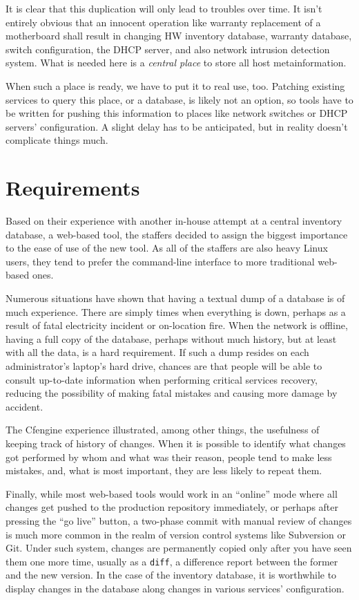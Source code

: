 \documentclass[11pt]{article}
\begin{document}
It is clear that this duplication will only lead to troubles over time.  It
isn't entirely obvious that an innocent operation like warranty replacement of a
motherboard shall result in changing HW inventory database, warranty database,
switch configuration, the DHCP server, and also network intrusion detection
system.  What is needed here is a {\em central place} to store all host
metainformation.

When such a place is ready, we have to put it to real use, too.  Patching
existing services to query this place, or a database, is likely not an option,
so tools have to be written for pushing this information to places like network
switches or DHCP servers' configuration.  A slight delay has to be anticipated,
but in reality doesn't complicate things much.

\section{Requirements}

Based on their experience with another in-house attempt at a central inventory
database, a web-based tool, the staffers decided to assign the biggest
importance to the ease of use of the new tool.  As all of the staffers are also
heavy Linux users, they tend to prefer the command-line interface to more
traditional web-based ones.

Numerous situations have shown that having a textual dump of a database is of
much experience.  There are simply times when everything is down, perhaps as a
result of fatal electricity incident or on-location fire.  When the network is
offline, having a full copy of the database, perhaps without much history, but
at least with all the data, is a hard requirement.  If such a dump resides on
each administrator's laptop's hard drive, chances are that people will be able
to consult up-to-date information when performing critical services recovery,
reducing the possibility of making fatal mistakes and causing more damage by
accident.

The Cfengine experience illustrated, among other things, the usefulness of
keeping track of history of changes.  When it is possible to identify what
changes got performed by whom and what was their reason, people tend to make
less mistakes, and, what is most important, they are less likely to repeat them.

Finally, while most web-based tools would work in an ``online'' mode where all
changes get pushed to the production repository immediately, or perhaps after
pressing the ``go live'' button, a two-phase commit with manual review of
changes is much more common in the realm of version control systems like
Subversion or Git.  Under such system, changes are permanently copied only after
you have seen them one more time, usually as a {\tt diff}, a difference report
between the former and the new version.  In the case of the inventory database,
it is worthwhile to display changes in the database along changes in various
services' configuration.
\end{document}
